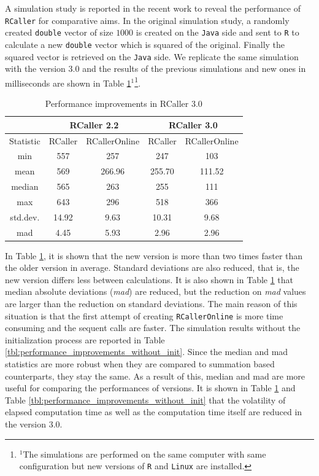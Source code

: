 \documentclass[10pt,a4paper, final, oneside]{article}
\begin{document}
A simulation study is reported in the recent work \cite{satman2014rcaller} to reveal the performance of \texttt{RCaller} for comparative aims. In the original simulation study, a randomly created \texttt{double} vector of size $1000$ is created on the \texttt{Java} side and sent to \texttt{R} to calculate a new  \texttt{double} vector which is squared of the original. Finally the squared vector is retrieved on the \texttt{Java} side. We replicate the same simulation with the version $3.0$ and the results of the previous simulations and new ones in milliseconds are shown in Table \ref{tbl:performance_improvements}$^1$\footnote{$^1$The simulations are performed on the same computer with same configuration but new versions of \texttt{R} and \texttt{Linux} are installed.}. 

\begin{table}[H]
\begin{center}
\caption{Performance improvements in RCaller 3.0}
\label{tbl:performance_improvements}
\begin{tabular}{|c|cc ||cc|}
\hline
          & \multicolumn{2}{c||}{RCaller 2.2}  &\multicolumn{2}{c|}{RCaller 3.0} \\
\hline
Statistic & RCaller & RCallerOnline & RCaller & RCallerOnline \\
\hline
min       & 557     & 257           & 247     & 103    \\
mean      & 569     & 266.96        & 255.70  & 111.52 \\
median    & 565     & 263           & 255     & 111    \\
max       & 643     & 296           & 518     & 366    \\
\hline
std.dev.  & 14.92   & 9.63          & 10.31   & 9.68   \\
mad       & 4.45    & 5.93          & 2.96    & 2.96   \\
\hline
\end{tabular}
\end{center}
\end{table}

In Table \ref{tbl:performance_improvements}, it is shown that the new version is more than two times faster
than the older version in average. Standard deviations are also reduced, that is, the new version differs less between calculations. It is also shown in Table \ref{tbl:performance_improvements} that median absolute deviations (\emph{mad}) are reduced, but the reduction on \emph{mad} values are larger than the reduction on standard deviations. The main reason of this situation is that the first attempt of creating \texttt{RCallerOnline} is more time consuming and the sequent calls are faster. The simulation results without the initialization process are reported in Table \ref{tbl:performance_improvements_without_init}. 
Since the median and mad statistics are more robust when they are compared to summation based counterparts, they stay the same. As a result of this, median and mad are more useful for comparing the performances of versions. It is shown in Table \ref{tbl:performance_improvements} and Table \ref{tbl:performance_improvements_without_init} that the volatility of elapsed computation time as well as the computation time itself are reduced in the version $3.0$. 
\end{document}

